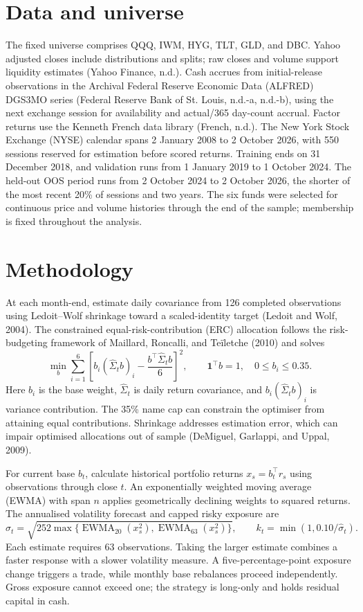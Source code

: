 \documentclass[11pt,letterpaper]{article}
\begin{document}
\section*{Data and universe}
The fixed universe comprises QQQ, IWM, HYG, TLT, GLD, and DBC. Yahoo adjusted closes include distributions and splits; raw closes and volume support liquidity estimates (Yahoo Finance, n.d.). Cash accrues from initial-release observations in the Archival Federal Reserve Economic Data (ALFRED) DGS3MO series (Federal Reserve Bank of St. Louis, n.d.-a, n.d.-b), using the next exchange session for availability and actual/365 day-count accrual. Factor returns use the Kenneth French data library (French, n.d.). The New York Stock Exchange (NYSE) calendar spans 2 January 2008 to 2 October 2026, with 550 sessions reserved for estimation before scored returns. Training ends on 31 December 2018, and validation runs from 1 January 2019 to 1 October 2024. The held-out OOS period runs from 2 October 2024 to 2 October 2026, the shorter of the most recent 20\% of sessions and two years. The six funds were selected for continuous price and volume histories through the end of the sample; membership is fixed throughout the analysis.

\section*{Methodology}
At each month-end, estimate daily covariance from 126 completed observations using Ledoit--Wolf shrinkage toward a scaled-identity target (Ledoit and Wolf, 2004). The constrained equal-risk-contribution (ERC) allocation follows the risk-budgeting framework of Maillard, Roncalli, and Teïletche (2010) and solves
\[
\min_b\sum_{i=1}^{6}\left[b_i(\widehat\Sigma_t b)_i-\frac{b^\top\widehat\Sigma_t b}{6}\right]^2,
\qquad \mathbf 1^\top b=1,\quad 0\le b_i\le0.35.
\]
Here $b_i$ is the base weight, $\widehat\Sigma_t$ is daily return covariance, and $b_i(\widehat\Sigma_t b)_i$ is variance contribution. The 35\% name cap can constrain the optimiser from attaining equal contributions. Shrinkage addresses estimation error, which can impair optimised allocations out of sample (DeMiguel, Garlappi, and Uppal, 2009).

For current base $b_t$, calculate historical portfolio returns $x_s=b_t^\top r_s$ using observations through close $t$. An exponentially weighted moving average (EWMA) with span $n$ applies geometrically declining weights to squared returns. The annualised volatility forecast and capped risky exposure are
\[
\widehat\sigma_t=\sqrt{252\max\{\operatorname{EWMA}_{20}(x_s^2),\operatorname{EWMA}_{63}(x_s^2)\}},\qquad k_t=\min(1,0.10/\widehat\sigma_t).
\]
Each estimate requires 63 observations. Taking the larger estimate combines a faster response with a slower volatility measure. A five-percentage-point exposure change triggers a trade, while monthly base rebalances proceed independently. Gross exposure cannot exceed one; the strategy is long-only and holds residual capital in cash.
\end{document}
